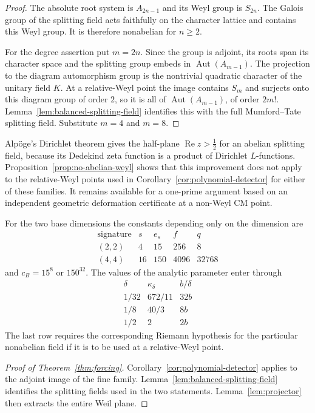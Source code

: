 \documentclass[11pt]{article}
\theoremstyle{definition}
\theoremstyle{remark}
\begin{document}
\begin{proof}
The absolute root system is $A_{2n-1}$ and its Weyl group is
$S_{2n}$.  The Galois group of the splitting field acts faithfully
on the character lattice and contains this Weyl group.  It is
therefore nonabelian for $n\geq2$.

For the degree assertion put $m=2n$.  Since the group is adjoint,
its roots span its character space and the splitting group embeds
in $\operatorname{Aut}(A_{m-1})$.  The projection to the diagram
automorphism group is the nontrivial quadratic character of the
unitary field $K$.  At a relative-Weyl point the image contains
$S_m$ and surjects onto this diagram group of order $2$, so it is
all of $\operatorname{Aut}(A_{m-1})$, of order $2m!$.
Lemma~\ref{lem:balanced-splitting-field} identifies this with the
full Mumford--Tate splitting field.  Substitute $m=4$ and $m=8$.
\end{proof}

Alp\"oge's Dirichlet theorem gives the half-plane
$\operatorname{Re}z>\tfrac12$ for an abelian splitting field,
because its Dedekind zeta function is a product of Dirichlet
$L$-functions.  Proposition~\ref{prop:no-abelian-weyl} shows that
this improvement does not apply to the relative-Weyl points used
in Corollary~\ref{cor:polynomial-detector} for either of these
families.  It remains available for a one-prime argument based on
an independent geometric deformation certificate at a non-Weyl CM
point.

For the two base dimensions the constants depending only on the
dimension are
\[
\begin{array}{c|c|c|c|c}
\text{signature}&s&e_s&f&q\\ \hline
(2,2)&4&15&256&8\\
(4,4)&16&150&4096&32768
\end{array}
\]
and $c_B=15^8$ or $150^{32}$.  The values of the analytic
parameter enter through
\[
\begin{array}{c|c|c}
\delta&\kappa_\delta&b/\delta\\ \hline
1/32&672/11&32b\\
1/8&40/3&8b\\
1/2&2&2b
\end{array}
\]
The last row requires the corresponding Riemann hypothesis for
the particular nonabelian field if it is to be used at a
relative-Weyl point.

\begin{proof}[Proof of Theorem~\ref{thm:forcing}]
Corollary~\ref{cor:polynomial-detector} applies to the adjoint image
of the fine family.  Lemma~\ref{lem:balanced-splitting-field}
identifies the splitting fields used in the two statements.
Lemma~\ref{lem:projector} then extracts the entire Weil plane.
\end{proof}
\end{document}
